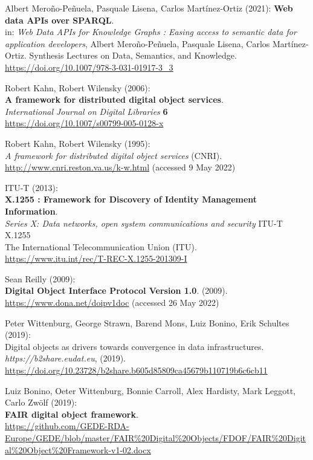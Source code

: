 \begin{thebibliography}{9}
Albert Meroño-Peñuela, Pasquale Lisena, Carlos Martínez-Ortiz (2021):
\textbf{Web data APIs over {SPARQL}}. \\
in: \emph{Web Data APIs for Knowledge Graphs : Easing access to semantic data for application developers}, 
Albert Meroño-Peñuela, Pasquale Lisena, Carlos Martínez-Ortiz.
Synthesis Lectures on Data, Semantics, and Knowledge.
\url{https://doi.org/10.1007/978-3-031-01917-3_3}

Robert Kahn, Robert Wilensky (2006): \\
\textbf{A framework for distributed digital object services}.\\
\emph{International Journal on Digital Libraries} \textbf{6} \\
\url{https://doi.org/10.1007/s00799-005-0128-x}

Robert Kahn, Robert Wilensky (1995): \\
\emph{A framework for distributed digital object services} (CNRI).
\url{http://www.cnri.reston.va.us/k-w.html} (accessed 9 May 2022)

ITU-T (2013): \\
\textbf{X.1255 : Framework for Discovery of Identity Management Information}.\\
\emph{Series X: Data networks, open system communications and security} ITU-T X.1255 \\
The International Telecommunication Union (ITU).\\
\url{https://www.itu.int/rec/T-REC-X.1255-201309-I}

Sean Reilly (2009): \\
\textbf{Digital Object Interface Protocol Version 1.0}.
(2009). \url{https://www.dona.net/doipv1doc} (accessed 26 May 2022)

Peter Wittenburg, George Strawn, Barend Mons, Luiz Bonino, Erik
Schultes (2019): \\
Digital objects as drivers towards convergence in data
infrastructures. \emph{https://b2share.eudat.eu}, (2019).
\url{https://doi.org/10.23728/b2share.b605d85809ca45679b110719b6c6cb11}

Luiz Bonino, Oeter Wittenburg, Bonnie Carroll, Alex Hardisty, Mark
Leggott, Carlo Zwölf (2019): \\
\textbf{{FAIR} digital object framework}. \\
\url{https://github.com/GEDE-RDA-Europe/GEDE/blob/master/FAIR\%20Digital\%20Objects/FDOF/FAIR\%20Digital\%20Object\%20Framework-v1-02.docx}


\end{thebibliography}
